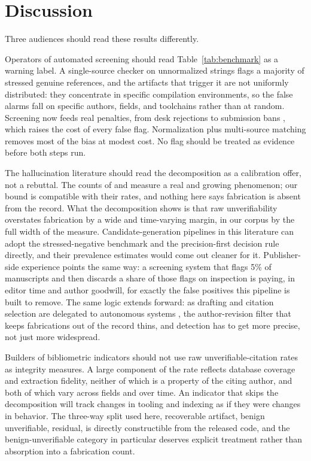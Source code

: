 \documentclass[11pt, a4paper]{article}
\begin{document}
\section{Discussion}
Three audiences should read these results differently.

Operators of automated screening should read Table~\ref{tab:benchmark} as a warning label. A single-source checker on unnormalized strings flags a majority of stressed genuine references, and the artifacts that trigger it are not uniformly distributed: they concentrate in specific compilation environments, so the false alarms fall on specific authors, fields, and toolchains rather than at random. Screening now feeds real penalties, from desk rejections to submission bans \citep{naddaf2026}, which raises the cost of every false flag. Normalization plus multi-source matching removes most of the bias at modest cost. No flag should be treated as evidence before both steps run.

The hallucination literature should read the decomposition as a calibration offer, not a rebuttal. The counts of \citet{sakai2026} and \citet{ghostcite2026} measure a real and growing phenomenon; our bound is compatible with their rates, and nothing here says fabrication is absent from the record. What the decomposition shows is that raw unverifiability overstates fabrication by a wide and time-varying margin, in our corpus by the full width of the measure. Candidate-generation pipelines in this literature can adopt the stressed-negative benchmark and the precision-first decision rule directly, and their prevalence estimates would come out cleaner for it. Publisher-side experience points the same way: a screening system that flags 5\% of manuscripts and then discards a share of those flags on inspection \citep{naddaf2026} is paying, in editor time and author goodwill, for exactly the false positives this pipeline is built to remove. The same logic extends forward: as drafting and citation selection are delegated to autonomous systems \citep{lu2024, messeri2024}, the author-revision filter that keeps fabrications out of the record thins, and detection has to get more precise, not just more widespread.

Builders of bibliometric indicators should not use raw unverifiable-citation rates as integrity measures. A large component of the rate reflects database coverage and extraction fidelity, neither of which is a property of the citing author, and both of which vary across fields and over time. An indicator that skips the decomposition will track changes in tooling and indexing as if they were changes in behavior. The three-way split used here, recoverable artifact, benign unverifiable, residual, is directly constructible from the released code, and the benign-unverifiable category in particular deserves explicit treatment rather than absorption into a fabrication count.
\end{document}
